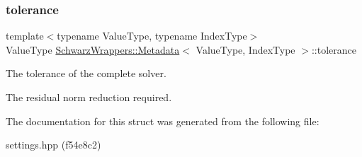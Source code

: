 \subsubsection{\texorpdfstring{tolerance}{tolerance}}
{\footnotesize\ttfamily template$<$typename Value\+Type, typename Index\+Type$>$ \\
Value\+Type \hyperlink{structSchwarzWrappers_1_1Metadata}{Schwarz\+Wrappers\+::\+Metadata}$<$ Value\+Type, Index\+Type $>$\+::tolerance}



The tolerance of the complete solver. 

The residual norm reduction required. 

The documentation for this struct was generated from the following file\+:\begin{DoxyCompactItemize}
\item 
settings.\+hpp (f54e8c2)\end{DoxyCompactItemize}
